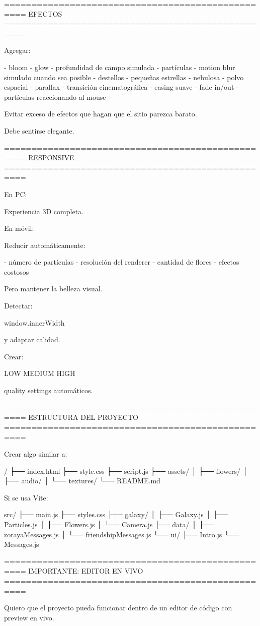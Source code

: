 ==================================================
EFECTOS
==================================================

Agregar:

- bloom
- glow
- profundidad de campo simulada
- partículas
- motion blur simulado cuando sea posible
- destellos
- pequeñas estrellas
- nebulosa
- polvo espacial
- parallax
- transición cinematográfica
- easing suave
- fade in/out
- partículas reaccionando al mouse

Evitar exceso de efectos que hagan que el sitio parezca barato.

Debe sentirse elegante.

==================================================
RESPONSIVE
==================================================

En PC:

Experiencia 3D completa.

En móvil:

Reducir automáticamente:

- número de partículas
- resolución del renderer
- cantidad de flores
- efectos costosos

Pero mantener la belleza visual.

Detectar:

window.innerWidth

y adaptar calidad.

Crear:

LOW
MEDIUM
HIGH

quality settings automáticos.

==================================================
ESTRUCTURA DEL PROYECTO
==================================================

Crear algo similar a:

/
├── index.html
├── style.css
├── script.js
├── assets/
│   ├── flowers/
│   ├── audio/
│   └── textures/
└── README.md

Si se usa Vite:

src/
├── main.js
├── styles.css
├── galaxy/
│   ├── Galaxy.js
│   ├── Particles.js
│   ├── Flowers.js
│   └── Camera.js
├── data/
│   ├── zorayaMessages.js
│   └── friendshipMessages.js
└── ui/
    ├── Intro.js
    └── Messages.js

==================================================
IMPORTANTE: EDITOR EN VIVO
==================================================

Quiero que el proyecto pueda funcionar dentro de un editor de código con preview en vivo.

